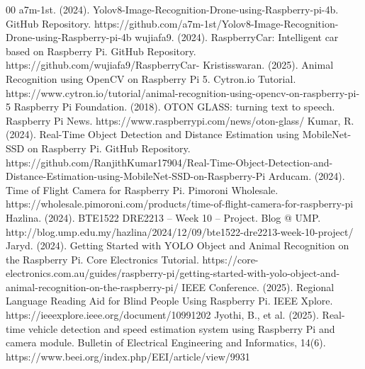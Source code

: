 \documentclass[conference]{IEEEtran}
\begin{document}
\begin{thebibliography}{00}
 a7m-1st. (2024). Yolov8-Image-Recognition-Drone-using-Raspberry-pi-4b. GitHub Repository. https://github.com/a7m-1st/Yolov8-Image-Recognition-Drone-using-Raspberry-pi-4b 
 wujiafa9. (2024). RaspberryCar: Intelligent car based on Raspberry Pi. GitHub Repository. https://github.com/wujiafa9/RaspberryCar- 
 Kristisswaran. (2025). Animal Recognition using OpenCV on Raspberry Pi 5. Cytron.io Tutorial. https://www.cytron.io/tutorial/animal-recognition-using-opencv-on-raspberry-pi-5 
 Raspberry Pi Foundation. (2018). OTON GLASS: turning text to speech. Raspberry Pi News. https://www.raspberrypi.com/news/oton-glass/ 
 Kumar, R. (2024). Real-Time Object Detection and Distance Estimation using MobileNet-SSD on Raspberry Pi. GitHub Repository. https://github.com/RanjithKumar17904/Real-Time-Object-Detection-and-Distance-Estimation-using-MobileNet-SSD-on-Raspberry-Pi 
 Arducam. (2024). Time of Flight Camera for Raspberry Pi. Pimoroni Wholesale. https://wholesale.pimoroni.com/products/time-of-flight-camera-for-raspberry-pi 
 Hazlina. (2024). BTE1522 DRE2213 – Week 10 – Project. Blog @ UMP. http://blog.ump.edu.my/hazlina/2024/12/09/bte1522-dre2213-week-10-project/ 
 Jaryd. (2024). Getting Started with YOLO Object and Animal Recognition on the Raspberry Pi. Core Electronics Tutorial. https://core-electronics.com.au/guides/raspberry-pi/getting-started-with-yolo-object-and-animal-recognition-on-the-raspberry-pi/ 
 IEEE Conference. (2025). Regional Language Reading Aid for Blind People Using Raspberry Pi. IEEE Xplore. https://ieeexplore.ieee.org/document/10991202 
 Jyothi, B., et al. (2025). Real-time vehicle detection and speed estimation system using Raspberry Pi and camera module. Bulletin of Electrical Engineering and Informatics, 14(6). https://www.beei.org/index.php/EEI/article/view/9931 
\end{thebibliography}
\end{document}
